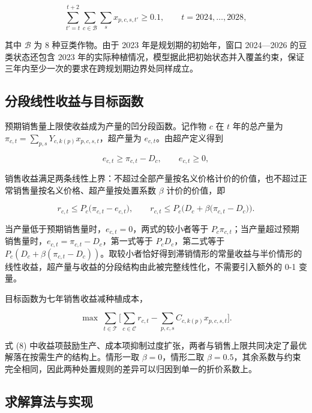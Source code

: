 \documentclass[bwprint]{gmcmthesis}
\begin{document}
\begin{equation}
\sum_{t'=t}^{t+2}\sum_{c\in\mathcal{B}}\sum_{s} x_{p,c,s,t'}\ge 0.1,\qquad t=2024,\dots,2028,
\end{equation}

其中 $\mathcal{B}$ 为 8 种豆类作物。由于 2023 年是规划期的初始年，窗口 2024—2026 的豆类状态还包含 2023 年的实际种植情况，模型据此把初始状态并入覆盖约束，保证三年内至少一次的要求在跨规划期边界处同样成立。

\subsection{分段线性收益与目标函数}

预期销售量上限使收益成为产量的凹分段函数。记作物 $c$ 在 $t$ 年的总产量为 $\pi_{c,t}=\sum_{p,s}Y_{c,k(p)}x_{p,c,s,t}$，超产量为 $e_{c,t}$。由超产定义得到

\begin{equation}
e_{c,t}\ge \pi_{c,t}-D_c,\qquad e_{c,t}\ge 0,
\end{equation}

销售收益满足两条线性上界：不超过全部产量按名义价格计价的价值，也不超过正常销售量按名义价格、超产量按处置系数 $\beta$ 计价的价值，即

\begin{equation}
r_{c,t}\le P_c\big(\pi_{c,t}-e_{c,t}\big),\qquad r_{c,t}\le P_c\Big(D_c+\beta\big(\pi_{c,t}-D_c\big)\Big).
\end{equation}

当产量低于预期销售量时，$e_{c,t}=0$，两式的较小者等于 $P_c\pi_{c,t}$；当产量超过预期销售量时，$e_{c,t}=\pi_{c,t}-D_c$，第一式等于 $P_cD_c$，第二式等于 $P_c(D_c+\beta(\pi_{c,t}-D_c))$。取较小者恰好得到滞销情形的常量收益与半价情形的线性收益，超产量与收益的分段结构由此被完整线性化，不需要引入额外的 0-1 变量。

目标函数为七年销售收益减种植成本，

\begin{equation}
\max\ \sum_{t\in\mathcal{T}}\Big[\sum_{c\in\mathcal{C}} r_{c,t}-\sum_{p,c,s} C_{c,k(p)}x_{p,c,s,t}\Big].
\end{equation}

式 (8) 中收益项鼓励生产、成本项抑制过度扩张，两者与销售上限共同决定了最优解落在按需生产的结构上。情形一取 $\beta=0$，情形二取 $\beta=0.5$，其余系数与约束完全相同，因此两种处置规则的差异可以归因到单一的折价系数上。

\subsection{求解算法与实现}
\end{document}
